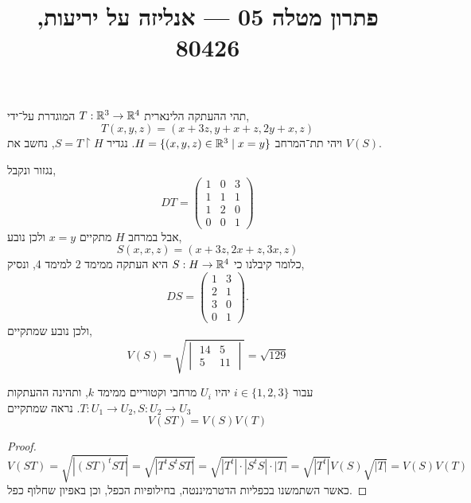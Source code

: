 
\title{פתרון מטלה 05 --- אנליזה על יריעות, 80426}

\DeclareMathOperator{\vol}{vol}


\maketitle
\maketitleprint{}

\question{}
\subquestion{}
תהי ההעתקה הלינארית $T : \mathbb{R}^3 \to \mathbb{R}^4$ המוגדרת על־ידי,
\[
	T(x, y, z)
	= (x + 3z, y + x + z, 2y + x, z)
\]
ויהי תת־המרחב $H = \{(x, y, z) \in \mathbb{R}^3 \mid x = y \}$.
נגדיר $S = T \restriction H$, נחשב את $V(S)$.
\begin{solution}
	נגזור ונקבל,
	\[
		D T
		= \begin{pmatrix}
			1 & 0 & 3 \\
			1 & 1 & 1 \\
			1 & 2 & 0 \\
			0 & 0 & 1
		\end{pmatrix}
	\]
	אבל במרחב $H$ מתקיים $x = y$ ולכן נובע,
	\[
		S(x, x, z)
		= (x + 3z, 2x + z, 3x, z)
	\]
	כלומר קיבלנו כי $S : H \to \mathbb{R}^4$ היא העתקה ממימד 2 למימד 4, ונסיק,
	\[
		D S
		= \begin{pmatrix}
			1 & 3 \\
			2 & 1 \\
			3 & 0 \\
			0 & 1
		\end{pmatrix}
	.\]
	ולכן נובע שמתקיים,
	\[
		V(S) = \sqrt{\begin{vmatrix}
				14 & 5 \\
				5 & 11
		\end{vmatrix}}
		= \sqrt{129}
	\]
\end{solution}

\subquestion{}
עבור $i \in \{1, 2, 3\}$ יהיו $U_i$ מרחבי וקטוריים ממימד $k$, ותהינה ההעתקות $T : U_1 \to U_2, S : U_2 \to U_3$.
נראה שמתקיים
\[
	V(ST) = V(S) V(T)
\]
\begin{proof}
	\[
		V(ST)
		= \sqrt{|{(ST)}^t ST|}
		= \sqrt{|T^t S^t ST|}
		= \sqrt{|T^t| \cdot |S^t S| \cdot |T|}
		= \sqrt{|T^t|} V(S) \sqrt{|T|}
		= V(S) V(T)
	\]
	כאשר השתמשנו בכפליות הדטרמיננטה, בחילופיות הכפל, וכן באפיון שחלוף כפל.
\end{proof}


